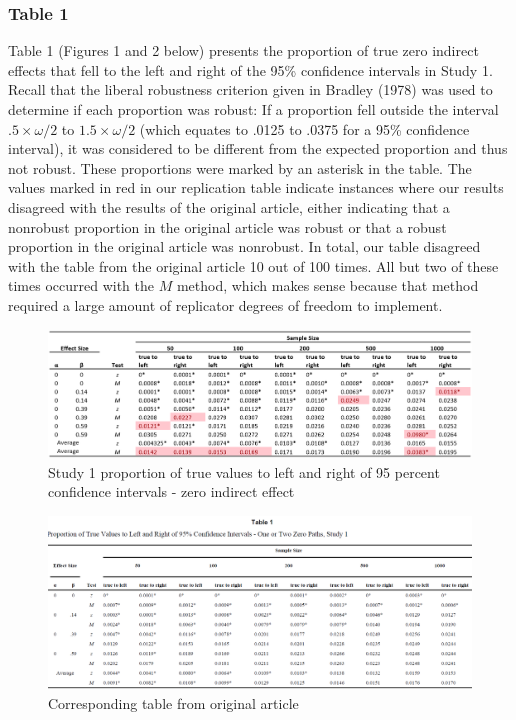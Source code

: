 \documentclass[10,a4paperpaper,]{article}
\begin{document}
\subsubsection{Table 1}

Table 1 (Figures 1 and 2 below) presents the proportion of true zero
indirect effects that fell to the left and right of the 95\% confidence
intervals in Study 1. Recall that the liberal robustness criterion given
in Bradley (1978) was used to determine if each proportion was robust:
If a proportion fell outside the interval \(.5 \times \omega/2\) to
\(1.5 \times \omega/2\) (which equates to .0125 to .0375 for a 95\%
confidence interval), it was considered to be different from the
expected proportion and thus not robust. These proportions were marked
by an asterisk in the table. The values marked in red in our replication
table indicate instances where our results disagreed with the results of
the original article, either indicating that a nonrobust proportion in
the original article was robust or that a robust proportion in the
original article was nonrobust. In total, our table disagreed with the
table from the original article 10 out of 100 times. All but two of
these times occurred with the \(M\) method, which makes sense because
that method required a large amount of replicator degrees of freedom to
implement.

\newpage
\begin{landscape}

\begin{figure}
\includegraphics[width=1\linewidth]{RepliSimsTable1} \caption{Study 1 proportion of true values to left and right of 95 percent confidence intervals - zero indirect effect}\label{fig:unnamed-chunk-1}
\end{figure}

\begin{figure}
\includegraphics[width=1\linewidth]{RepliSimsMacKinnonTable1} \caption{Corresponding table from original article}\label{fig:unnamed-chunk-2}
\end{figure}

\end{landscape}
\end{document}

